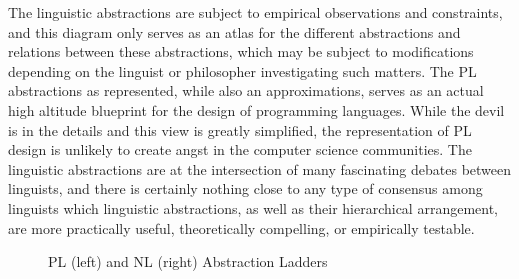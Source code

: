 The linguistic abstractions are subject to empirical observations and
constraints, and this diagram only serves as an atlas for the different
abstractions and relations between these abstractions, which may be subject to
modifications depending on the linguist or philosopher investigating such
matters. The PL abstractions as represented, while also an approximations,
serves as an actual high altitude blueprint for the design of programming
languages. While the devil is in the details and this view is greatly
simplified, the representation of PL design is unlikely to create angst in the
computer science communities. The linguistic abstractions are at the
intersection of many fascinating debates between linguists, and there is
certainly nothing close to any type of consensus among linguists which
linguistic abstractions, as well as their hierarchical arrangement, are more
practically useful, theoretically compelling, or empirically testable.

\begin{figure}
\centering
{}
\hspace{1cm}
\caption{PL (left) and NL (right) Abstraction Ladders} \label{fig:M1}
\end{figure}


